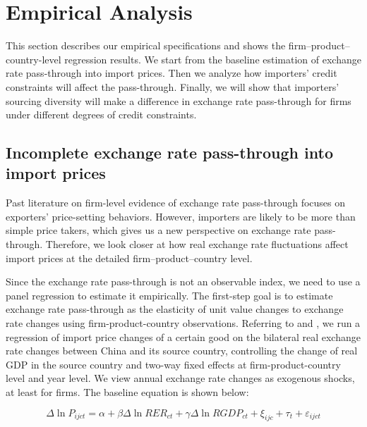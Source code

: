 \section{Empirical Analysis} \label{Empirical}

This section describes our empirical specifications and shows the firm–product–country-level regression results. We start from the baseline estimation of exchange rate pass-through into import prices. Then we analyze how importers' credit constraints will affect the pass-through. Finally, we will show that importers' sourcing diversity will make a difference in exchange rate pass-through for firms under different degrees of credit constraints. 

\subsection{Incomplete exchange rate pass-through into import prices} \label{Empirical-Baseline}

Past literature on firm-level evidence of exchange rate pass-through focuses on exporters' price-setting behaviors. However, importers are likely to be more than simple price takers, which gives us a new perspective on exchange rate pass-through. Therefore, we look closer at how real exchange rate fluctuations affect import prices at the detailed firm–product–country level.

Since the exchange rate pass-through is not an observable index, we need to use a panel regression to estimate it empirically. The first-step goal is to estimate exchange rate pass-through as the elasticity of unit value changes to exchange rate changes using firm-product-country observations. Referring to \cite{aik2014} and \cite{lmx2015}, we run a regression of import price changes of a certain good on the bilateral real exchange rate changes between China and its source country, controlling the change of real GDP in the source country and two-way fixed effects at firm-product-country level and year level. We view annual exchange rate changes as exogenous shocks, at least for firms. The baseline equation is shown below:

\begin{equation}
	\Delta \ln P_{i j c t}=\alpha+\beta \Delta \ln R E R_{c t}+\gamma \Delta \ln R G D P_{c t}+\xi_{i j c}+\tau_{t}+\varepsilon_{i j c t}
	\label{eq.baseline}
\end{equation}

